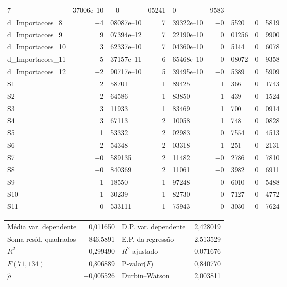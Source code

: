 \documentclass[11pt]{article}
\begin{document}
\begin{center}
\begin{tabular}{lr@{,}lr@{,}lr@{,}lr@{,}l}
    7&37006\textrm{e--10} &
      $-$0&05241 &
        0&9583 \\
d\_Importacoes\_8 &
  $-$4&08087\textrm{e--10} &
    7&39322\textrm{e--10} &
      $-$0&5520 &
        0&5819 \\
d\_Importacoes\_9 &
  9&07394\textrm{e--12} &
    7&22190\textrm{e--10} &
      0&01256 &
        0&9900 \\
d\_Importacoes\_10 &
  3&62337\textrm{e--10} &
    7&04360\textrm{e--10} &
      0&5144 &
        0&6078 \\
d\_Importacoes\_11 &
  $-$5&37157\textrm{e--11} &
    6&65468\textrm{e--10} &
      $-$0&08072 &
        0&9358 \\
d\_Importacoes\_12 &
  $-$2&90717\textrm{e--10} &
    5&39495\textrm{e--10} &
      $-$0&5389 &
        0&5909 \\
S1 &
  2&58701 &
    1&89425 &
      1&366 &
        0&1743 \\
S2 &
  2&64586 &
    1&83850 &
      1&439 &
        0&1524 \\
S3 &
  3&11933 &
    1&83469 &
      1&700 &
        0&0914 \\
S4 &
  3&67113 &
    2&10058 &
      1&748 &
        0&0828 \\
S5 &
  1&53332 &
    2&02983 &
      0&7554 &
        0&4513 \\
S6 &
  2&54348 &
    2&03318 &
      1&251 &
        0&2131 \\
S7 &
  $-$0&589135 &
    2&11482 &
      $-$0&2786 &
        0&7810 \\
S8 &
  $-$0&840369 &
    2&11061 &
      $-$0&3982 &
        0&6911 \\
S9 &
  1&18550 &
    1&97248 &
      0&6010 &
        0&5488 \\
S10 &
  1&30239 &
    1&82730 &
      0&7127 &
        0&4772 \\
S11 &
  0&533111 &
    1&75943 &
      0&3030 &
        0&7624 \\
\end{tabular}

\vspace{1ex}
\begin{tabular}{lrlr}
Média var. dependente &  0,011650 & D.P. var. dependente &  2,428019 \\
Soma resíd. quadrados &  846,5891 & E.P. da regressão &  2,513529 \\
$R^2$ &  0,299490 & $R^2$ ajustado & -0,071676 \\
$F(71, 134)$ &  0,806889 & P-valor($F$) &  0,840770 \\
$\hat{\rho}$ & $-$0,005526 & Durbin--Watson &  2,003811 \\
\end{tabular}


\end{center}
\end{document}
